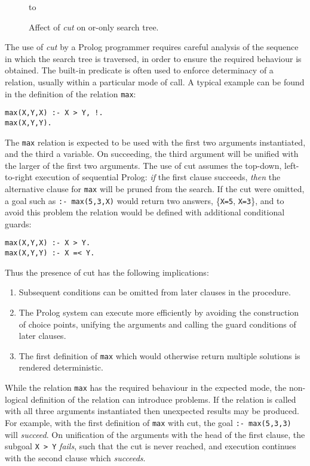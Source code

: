 \begin{figure}[htbp]
\vspace{5mm} \hbox to 
\caption{Affect of \textit{cut} on or-only search tree.}
\vspace{5mm}
\label{cut_or_only_tree}
\end{figure}

The use of \textit{cut} by a Prolog programmer requires careful analysis of the sequence in
which the search tree is traversed, in order to ensure the required behaviour is obtained.
The built-in predicate is often used to enforce determinacy of a relation, usually within a
particular mode of call.  A typical example can be found in the definition of the
relation \texttt{max}:
\begin{verbatim}
max(X,Y,X) :- X > Y, !.
max(X,Y,Y).
\end{verbatim}
The \texttt{max} relation is expected to be used with the first two arguments instantiated,
and the third a variable.  On succeeding, the third argument will be unified with the
larger of the first two arguments.  The use of cut assumes the top-down, left-to-right
execution of sequential Prolog:  \textit{if} the first clause succeeds, \textit{then} the
alternative clause for \texttt{max} will be pruned from the search.  If the cut were
omitted, a goal such as \texttt{:- max(5,3,X)} would return two answers, \{\texttt{X=5},
\texttt{X=3}\}, and to avoid this problem the relation would be defined with additional
conditional guards:
\begin{verbatim}
max(X,Y,X) :- X > Y.
max(X,Y,Y) :- X =< Y.
\end{verbatim}
Thus the presence of cut has the following implications:
\begin{enumerate}
\item{Subsequent conditions can be omitted from later clauses in the procedure.}
\item{The Prolog system can execute more efficiently by avoiding the construction of
  choice points, unifying the arguments and calling the guard conditions of later clauses.}
\item{The first definition of \texttt{max} which would otherwise return multiple
  solutions is rendered deterministic.}
\end{enumerate}
While the relation \texttt{max} has the required behaviour in the expected mode, the
non-logical definition of the relation can introduce problems.  If the relation is
called with all three arguments instantiated then unexpected results may be produced.
For example, with the first definition of \texttt{max} with cut,
the goal \texttt{:- max(5,3,3)} will \textit{succeed}.  On unification of the arguments with
the head of the first clause, the subgoal \texttt{X > Y} \textit{fails}, such that the
cut is never reached, and execution continues with the second clause which \textit{succeeds}.

